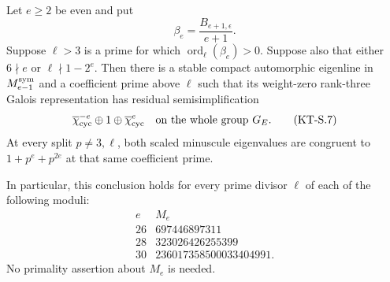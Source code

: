 \begin{corollary}
Let $e\geq2$ be even and put
\[
      \beta_e=\frac{B_{e+1,\epsilon}}{e+1}.
\]
Suppose $\ell>3$ is a prime for which
$\operatorname{ord}_\ell(\beta_e)>0$.  Suppose also that
either $6\nmid e$ or $\ell\nmid1-2^e$.  Then there is a stable
compact automorphic eigenline in $M_{e-1}^{\rm sym}$ and a
coefficient prime above $\ell$ such that its weight-zero
rank-three Galois representation has residual
semisimplification
\[
 \overline\chi_{\rm cyc}^{-e}\oplus1\oplus
       \overline\chi_{\rm cyc}^{e}
       \quad\hbox{on the whole group }G_E.                     \tag{KT-S.7}
\]
At every split $p\ne3,\ell$, both scaled minuscule eigenvalues
are congruent to $1+p^e+p^{2e}$ at that same coefficient prime.

In particular, this conclusion holds for every prime divisor
$\ell$ of each of the following moduli:
\[
 \begin{array}{c|r}
 e&M_e\\\hline
 26&697446897311\\
 28&323026426255399\\
 30&236017358500033404991.
 \end{array}                                                  \tag{KT-S.8}
\]
No primality assertion about $M_e$ is needed.
\end{corollary}
